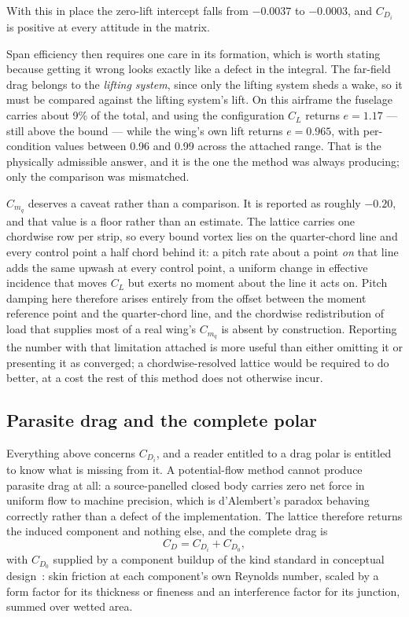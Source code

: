 \documentclass[submit]{aiaa-tc}%
\begin{document}
With this in place the zero-lift intercept falls from $-0.0037$ to
$-0.0003$, and $C_{D_i}$ is positive at every attitude in the matrix.

Span efficiency then requires one care in its formation, which is worth
stating because getting it wrong looks exactly like a defect in the
integral. The far-field drag belongs to the \emph{lifting system}, since
only the lifting system sheds a wake, so it must be compared against the
lifting system's lift. On this airframe the fuselage carries about 9\% of
the total, and using the configuration $C_L$ returns $e = 1.17$ --- still
above the bound --- while the wing's own lift returns $e = 0.965$, with
per-condition values between 0.96 and 0.99 across the attached range. That
is the physically admissible answer, and it is the one the method was
always producing; only the comparison was mismatched.

$C_{m_q}$ deserves a caveat rather than a comparison. It is reported as
roughly $-0.20$, and that value is a floor rather than an estimate. The
lattice carries one chordwise row per strip, so every bound vortex lies on
the quarter-chord line and every control point a half chord behind it: a
pitch rate about a point \emph{on} that line adds the same upwash at every
control point, a uniform change in effective incidence that moves $C_L$
but exerts no moment about the line it acts on. Pitch damping here
therefore arises entirely from the offset between the moment reference
point and the quarter-chord line, and the chordwise redistribution of load
that supplies most of a real wing's $C_{m_q}$ is absent by construction.
Reporting the number with that limitation attached is more useful than
either omitting it or presenting it as converged; a chordwise-resolved
lattice would be required to do better, at a cost the rest of this method
does not otherwise incur.

\subsection{Parasite drag and the complete polar}
\label{sec:parasite}

Everything above concerns $C_{D_i}$, and a reader entitled to a drag
polar is entitled to know what is missing from it. A potential-flow
method cannot produce parasite drag at all: a source-panelled closed body
carries zero net force in uniform flow to machine precision, which is
d'Alembert's paradox behaving correctly rather than a defect of the
implementation. The lattice therefore returns the induced component and
nothing else, and the complete drag is
\begin{equation}
  C_D = C_{D_i} + C_{D_0},
  \label{eq:totaldrag}
\end{equation}
with $C_{D_0}$ supplied by a component buildup of the kind standard in
conceptual design~\cite{raymer2018,hoerner1965fluiddynamicdrag}: skin
friction at each component's own Reynolds number, scaled by a form factor
for its thickness or fineness and an interference factor for its
junction, summed over wetted area.
\end{document}
